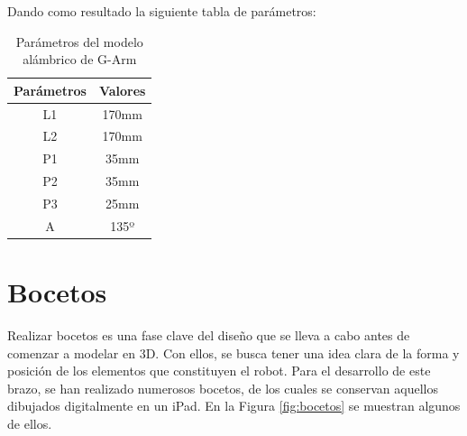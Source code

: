 Dando como resultado la siguiente tabla de parámetros:
\begin{table}[H]
\begin{center}
\begin{tabular}{|c|c|}
\hline
\textbf{Parámetros} & \textbf{Valores} \\
\hline
L1 & 170mm \\
L2 & 170mm \\
P1 & 35mm \\
P2 & 35mm \\
P3 & 25mm \\
A & 135º \\
\hline
\end{tabular}
\caption{Parámetros del modelo alámbrico de G-Arm}
\label{cuadro:parametros_alambrico}
\end{center}
\end{table}
\newpage
\section{Bocetos}
\noindent Realizar bocetos es una fase clave del diseño que se lleva a cabo antes de comenzar a modelar en 3D. Con ellos, se busca tener una idea 
clara de la forma 
y posición de los elementos que constituyen el robot.  
Para el desarrollo de este brazo, se han realizado numerosos bocetos, de los cuales se conservan aquellos dibujados digitalmente en 
un iPad. En la Figura \ref{fig:bocetos} se muestran algunos de ellos.

